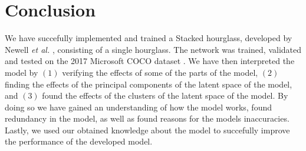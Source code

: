 \documentclass[./main.tex]{subfiles}
\begin{document}
\section{Conclusion}\label{sec:conclusion} 
We have succefully implemented and trained a Stacked hourglass, developed by Newell \textit{et al.} \cite{Newell}, consisting of a single hourglass. The network was trained, validated and tested on the 2017 Microsoft COCO dataset \cite{COCO_article}. We have then interpreted the model by $(1)$ verifying the effects of some of the parts of the model, $(2)$ finding the effects of the principal components of the latent space of the model, and $(3)$ found the effects of the clusters of the latent space of the model. By doing so we have gained an understanding of how the model works, found redundancy in the model, as well as found reasons for the models inaccuracies. Lastly, we used our obtained knowledge about the model to succefully improve the performance of the developed model.
\end{document}
